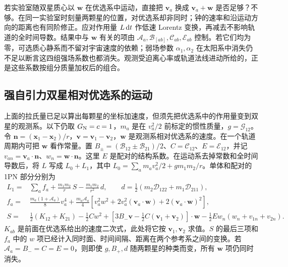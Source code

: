 若实验室随双星质心以 $\bm w$ 在优选系中运动，直接把 $\bm v_a$ 换成 $\bm v_a+\bm w$ 是否足够？不够。在同一实验室时刻量两颗星的位置，对优选系却非同时；钟的速率和沿运动方向的距离也有同阶修正。应对作用量 $L\,\dd t$ 作低速 Lorentz 变换，再减去不影响轨道的全时间导数。结果中与 $\bm w$ 有关的项由 $\mathcal A_a,\mathcal B_{[ab]},\mathcal C_{ab},\mathcal E_{ab}$ 控制。若它们均为零，可选质心静系而不留对宇宙速度的依赖；弱场参数 $\alpha_1,\alpha_2$ 在太阳系中消失仍不足以断言这四组强场系数也都消失。观测受迫离心率或轨道法线进动所给的，正是这些系数按组分质量加权后的组合。

\subsection{强自引力双星相对优选系的运动}

上面的拉氏量已足以算出每颗星的坐标加速度，但须先把优选系中的作用量变到双星的观测系。以下仍取 $G_{\rm N}=c=1$，$m_a$ 是在 $v_a^2/2$ 前标定的惯性质量，$g=\mathcal G_{12}$。令 $\bm n=(\bm x_1-\bm x_2)/r$，$\bm v=\bm v_1-\bm v_2$，$\bm w$ 是观测系相对优选系的速度。在一个轨道周期内可把 $\bm w$ 看作常量。置 $B_\pm=(\mathcal B_{12}\pm\mathcal B_{21})/2$、$C=\mathcal C_{12}$、$E=\mathcal E_{12}$，并记 $v_{an}=\bm v_a\cdot\bm n$、$w_n=\bm w\cdot\bm n$。这里 $E$ 是配对的结构系数。在运动系去掉常数和全时间导数后，将 $L$ 写成 $L_0+L_1$，其中 $L_0=\sum_a m_av_a^2/2+gm_1m_2/r$。单体和配对的 1PN 部分分别为
\begin{align*}
 L_1={}&\sum_a f_a+\frac{m_1m_2}{r}\,S-\frac{m_1m_2}{r^2}\,d,\qquad
 d=\tfrac12(m_2\mathcal D_{122}+m_1\mathcal D_{211}),\\
 f_a={}&\frac{m_a(1+\mathcal A_a)}{8}v_a^4+
   \frac{m_a\mathcal A_a}{4}
       [v_a^2 w^2+2v_a^2(\bm v_a\cdot\bm w)+2(\bm v_a\cdot\bm w)^2],\\
 S={}&\tfrac12(K_{12}+K_{21})-\tfrac12 C w^2
     +[3B_-\bm v-\tfrac12 C(\bm v_1+\bm v_2)]\cdot\bm w
     -\tfrac12 E w_n(w_n+v_{1n}+v_{2n}) .
\end{align*}
$K_{ab}$ 是前面在优选系给出的速度二次式，此处将它按 $\bm v_1,\bm v_2$ 求值。$S$ 的最后三项和 $f_a$ 中的 $w$ 项已经计入同时面、时间间隔、距离在两个参考系之间的变换。若 $\mathcal A_a=B_-=C=E=0$，则即使 $g,B_+,d$ 随两颗星的种类而变，所有 $\bm w$ 项仍同时消失。

